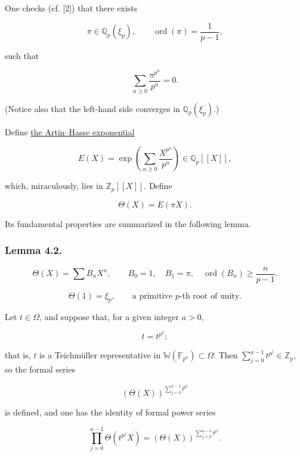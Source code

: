 One checks (cf. [2]) that there exists

\begin{equation}\tag{4.1.4}
\pi\in\mathbb Q_p(\xi_p),\qquad
\operatorname{ord}(\pi)=\frac1{p-1},
\end{equation}

such that

\begin{equation}\tag{4.1.5}
\sum_{n\geq0}\frac{\pi^{p^n}}{p^n}=0.
\end{equation}

(Notice also that the left-hand side converges in $\mathbb Q_p(\xi_p)$.)

Define \underline{the Artin--Hasse exponential}

\begin{equation}\tag{4.1.6}
E(X)=\exp\!\left(\sum_{n\geq0}\frac{X^{p^n}}{p^n}\right)
\in\mathbb Q_p[[X]],
\end{equation}

which, miraculously, lies in $\mathbb Z_p[[X]]$. Define

\begin{equation}\tag{4.1.7}
\Theta(X)=E(\pi X).
\end{equation}

Its fundamental properties are summarized in the following lemma.

\subsubsection*{Lemma 4.2.}

\begin{equation}\tag{4.2.1}
\Theta(X)=\sum B_n X^n,\qquad B_0=1,\quad B_1=\pi,\quad
\operatorname{ord}(B_n)\geq\frac n{p-1}.
\end{equation}

\begin{equation}\tag{4.2.2}
\Theta(1)=\xi_p,\qquad\text{a primitive $p$-th root of unity.}
\end{equation}

Let $t\in\Omega$, and suppose that, for a given integer $a>0$,

\begin{equation}\tag{4.2.3}
t=t^{p^a};
\end{equation}

that is, $t$ is a Teichmüller representative in
$\mathbb W(\mathbb F_{p^a})\subset\Omega$. Then
$\sum_{j=0}^{a-1}t^{p^j}\in\mathbb Z_p$, so the formal series

\[
(\Theta(X))^{\sum_{j=0}^{a-1}t^{p^j}}
\]

is defined, and one has the identity of formal power series

\begin{equation}\tag{4.2.3.1}
\prod_{j=0}^{a-1}\Theta(t^{p^j}X)
=(\Theta(X))^{\sum_{j=0}^{a-1}t^{p^j}}.
\end{equation}
